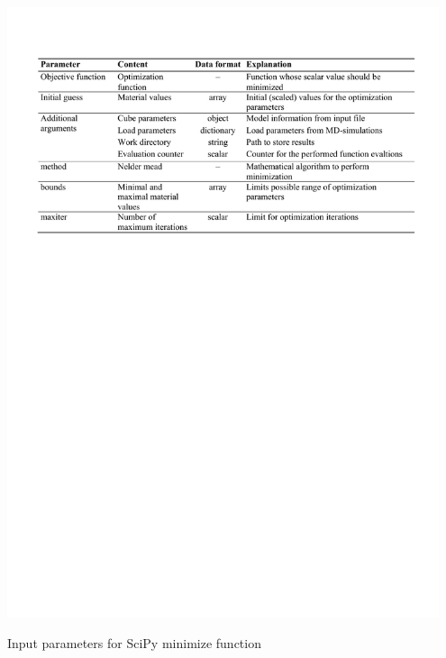     \begin{table}[H]
    \centering
    \includegraphics[width=0.95\textwidth]{minimizeFuncitonInput.pdf}
    \caption{Input parameters for SciPy minimize function}
    \label{tab:minimizeFunctionInput}
\end{table}

